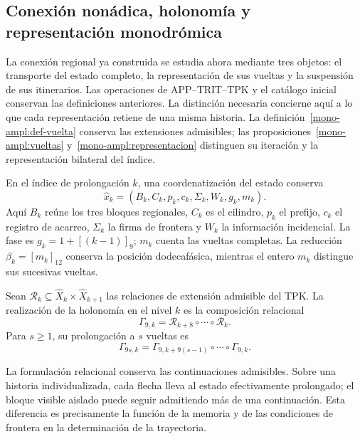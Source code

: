 \subsection{Conexión nonádica, holonomía y representación monodrómica}
\label{mono-ampl:conexion}

La conexión regional ya construida se estudia ahora mediante tres objetos:
el transporte del estado completo, la representación de sus vueltas y la
suspensión de sus itinerarios. Las operaciones de APP--TRIT--TPK y el
catálogo inicial conservan las definiciones anteriores. La distinción
necesaria concierne aquí a lo que cada representación retiene de una
misma historia. La definición~\ref{mono-ampl:def-vuelta} conserva
las extensiones admisibles; las proposiciones~\ref{mono-ampl:vueltas}
y~\ref{mono-ampl:representacion} distinguen su iteración y la
representación bilateral del índice.

En el índice de prolongación \(k\), una coordenatización del estado conserva
\[
 \widehat x_k=(B_k,C_k,p_k,c_k,\Sigma_k,W_k,g_k,m_k).
\]
Aquí \(B_k\) reúne los tres bloques regionales, \(C_k\) es el cilindro,
\(p_k\) el prefijo, \(c_k\) el registro de acarreo, \(\Sigma_k\) la firma
de frontera y \(W_k\) la información incidencial. La fase es
\(g_k=1+[(k-1)]_9\); \(m_k\) cuenta las vueltas completas. La reducción
\(\beta_k=[m_k]_{12}\) conserva la posición dodecafásica, mientras el
entero \(m_k\) distingue sus sucesivas vueltas.

\begin{definition}
\label{mono-ampl:def-vuelta}
Sean \(\mathcal R_k\subseteq\widehat X_k\times\widehat X_{k+1}\)
las relaciones de extensión admisible del TPK. La realización de la
holonomía en el nivel \(k\) es la composición relacional
\[
 \Gamma_{9,k}=\mathcal R_{k+8}\circ\cdots\circ\mathcal R_k.
\]
Para \(s\geq1\), su prolongación a \(s\) vueltas es
\[
 \Gamma_{9s,k}=
 \Gamma_{9,k+9(s-1)}\circ\cdots\circ\Gamma_{9,k}.
\]
\end{definition}

La formulación relacional conserva las continuaciones admisibles. Sobre
una historia individualizada, cada flecha lleva al estado efectivamente
prolongado; el bloque visible aislado puede seguir admitiendo más de una
continuación. Esta diferencia es precisamente la función de la memoria y
de las condiciones de frontera en la determinación de la trayectoria.

